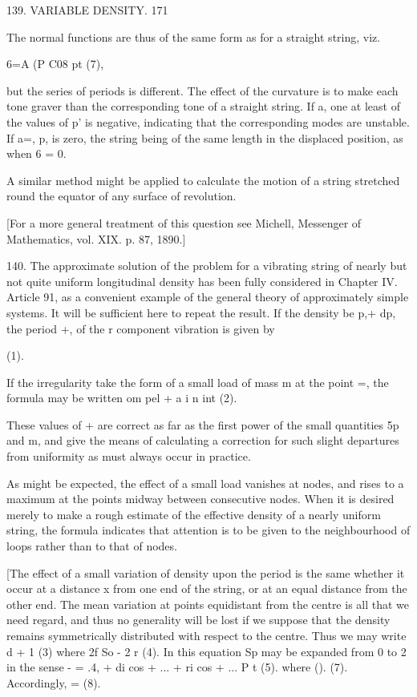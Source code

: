 139. VARIABLE DENSITY. 171

The normal functions are thus of the same form as for a straight string, viz.

6=A (P C08 pt (7),

but the series of periods is different. The effect of the curvature is to make
each tone graver than the corresponding tone of a straight string. If a, one at
least of the values of p' is negative, indicating that the corresponding modes
are unstable. If a=, p, is zero, the string being of the same length in the
displaced position, as when 6 = 0.

A similar method might be applied to calculate the motion of a string stretched
round the equator of any surface of revolution.

[For a more general treatment of this question see Michell, Messenger of
Mathematics, vol. XIX. p. 87, 1890.]

140. The approximate solution of the problem for a vibrating string of nearly
but not quite uniform longitudinal density has been fully considered in Chapter
IV. Article 91, as a convenient example of the general theory of approximately
simple systems. It will be sufficient here to repeat the result. If the density
be p,+ dp, the period +, of the r component vibration is given by

(1).

If the irregularity take the form of a small load of mass m at the point =, the
formula may be written om pel + a i n int (2).

These values of + are correct as far as the first power of the small quantities
5p and m, and give the means of calculating a correction for such slight
departures from uniformity as must always occur in practice.

As might be expected, the effect of a small load vanishes at nodes, and rises
to a maximum at the points midway between consecutive nodes. When it is desired
merely to make a rough estimate of the effective density of a nearly uniform
string, the formula indicates that attention is to be given to the
neighbourhood of loops rather than to that of nodes.

[The effect of a small variation of density upon the period is the same whether
it occur at a distance x from one end of the string, or at an equal distance
from the other end. The mean variation at points equidistant from the centre is
all that we need regard, and thus no generality will be lost if we suppose that
the density remains symmetrically distributed with respect to the centre.  Thus
we may write d + 1 (3) where
2f So - 2 r (4).
In this equation Sp may be expanded from 0 to 2 in the sense
- = .4, + di cos + ... + ri cos + ...  P t (5).  where ().  (7).
Accordingly, = (8).

